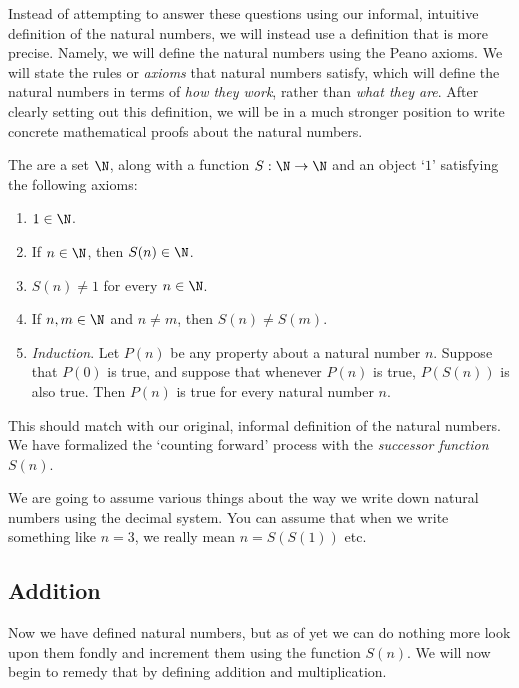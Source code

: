 \documentclass[a4paper]{scrreprt}
\begin{document}
Instead of attempting to answer these questions using our informal, intuitive definition of the natural numbers, we will instead use a definition that is more precise. Namely, we will define the natural numbers using the Peano axioms. We will state the rules or \emph{axioms} that natural numbers satisfy, which will define the natural numbers in terms of \emph{how they work}, rather than \emph{what they are}. After clearly setting out this definition, we will be in a much stronger position to write concrete mathematical proofs about the natural numbers.

\begin{definition}
	The  are a set $\N$, along with a function $S: \N \rightarrow \N$ and an object `$1$' satisfying the following axioms:
	\begin{enumerate}
		\item $1 \in \N$.
		\item If $n \in \N$, then $S(n) \in \N$.
		\item $S(n) \neq 1$ for every $n \in \N$.
		\item If $n, m \in \N$ and $n \neq m$, then $S(n) \neq S(m)$.
		\item \emph{Induction}. Let $P(n)$ be any property about a natural number $n$. Suppose that $P(0)$ is true, and suppose that whenever $P(n)$ is true, $P(S(n))$ is also true. Then $P(n)$ is true for every natural number $n$.
	\end{enumerate}
\end{definition}

This should match with our original, informal definition of the natural numbers. We have formalized the `counting forward' process with the \emph{successor function} $S(n)$.

\begin{remark}
	We are going to assume various things about the way we write down natural numbers using the decimal system. You can assume that when we write something like $n = 3$, we really mean $n = S(S(1))$ etc.
\end{remark}


\subsection{Addition}

Now we have defined natural numbers, but as of yet we can do nothing more look upon them fondly and increment them using the function $S(n)$. We will now begin to remedy that by defining addition and multiplication.
\end{document}
